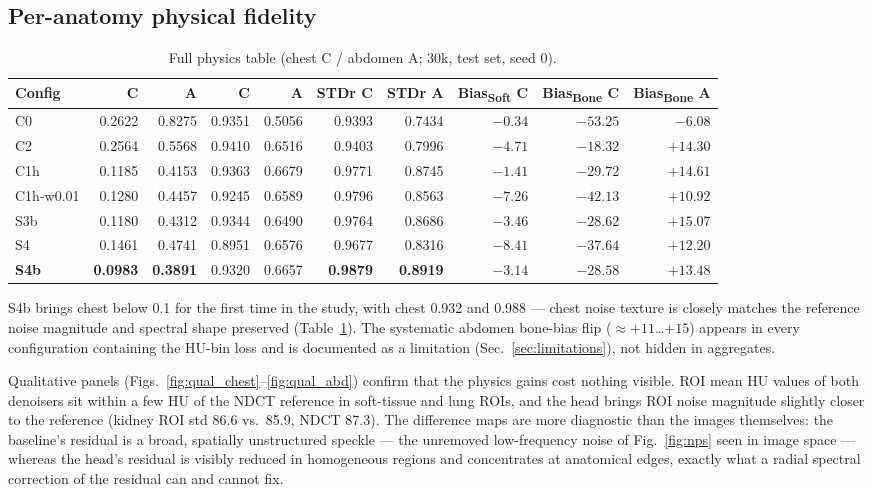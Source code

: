 \subsection{Per-anatomy physical fidelity}
\label{sec:peranat}

\begin{table}[!tp]
\centering
\caption{Full physics table (chest C / abdomen A; 30k, test set, seed 0).}
\label{tab:physics}
\small
\begin{tabular}{lrrrrrrrrr}
\toprule
Config & \npsl{} C & \npsl{} A & \npsc{} C & \npsc{} A & STDr C & STDr A & Bias\textsubscript{Soft} C & Bias\textsubscript{Bone} C & Bias\textsubscript{Bone} A \\
\midrule
C0 & 0.2622 & 0.8275 & 0.9351 & 0.5056 & 0.9393 & 0.7434 & $-0.34$ & $-53.25$ & $-6.08$ \\
C2 & 0.2564 & 0.5568 & 0.9410 & 0.6516 & 0.9403 & 0.7996 & $-4.71$ & $-18.32$ & $+14.30$ \\
C1h & 0.1185 & 0.4153 & 0.9363 & 0.6679 & 0.9771 & 0.8745 & $-1.41$ & $-29.72$ & $+14.61$ \\
C1h-w0.01 & 0.1280 & 0.4457 & 0.9245 & 0.6589 & 0.9796 & 0.8563 & $-7.26$ & $-42.13$ & $+10.92$ \\
S3b & 0.1180 & 0.4312 & 0.9344 & 0.6490 & 0.9764 & 0.8686 & $-3.46$ & $-28.62$ & $+15.07$ \\
S4 & 0.1461 & 0.4741 & 0.8951 & 0.6576 & 0.9677 & 0.8316 & $-8.41$ & $-37.64$ & $+12.20$ \\
\textbf{S4b} & \textbf{0.0983} & \textbf{0.3891} & 0.9320 & 0.6657 & \textbf{0.9879} & \textbf{0.8919} & $-3.14$ & $-28.58$ & $+13.48$ \\
\bottomrule
\end{tabular}
\end{table}

S4b brings chest \npsl{} below 0.1 for the first time in the study, with chest \npsc{} 0.932 and \stdr{} 0.988 --- chest noise texture is closely matches the reference noise magnitude and spectral shape preserved (Table~\ref{tab:physics}). The systematic abdomen bone-bias flip (${\approx}{+}11$\ldots${+}15$\hu{}) appears in every configuration containing the HU-bin loss and is documented as a limitation (Sec.~\ref{sec:limitations}), not hidden in aggregates.

Qualitative panels (Figs.~\ref{fig:qual_chest}--\ref{fig:qual_abd}) confirm that the physics gains cost nothing visible. ROI mean HU values of both denoisers sit within a few HU of the NDCT reference in soft-tissue and lung ROIs, and the head brings ROI noise magnitude slightly closer to the reference (kidney ROI std 86.6 vs.\ 85.9\hu{}, NDCT 87.3). The difference maps are more diagnostic than the images themselves: the baseline's residual is a broad, spatially unstructured speckle --- the unremoved low-frequency noise of Fig.~\ref{fig:nps} seen in image space --- whereas the head's residual is visibly reduced in homogeneous regions and concentrates at anatomical edges, exactly what a radial spectral correction of the residual can and cannot fix.

